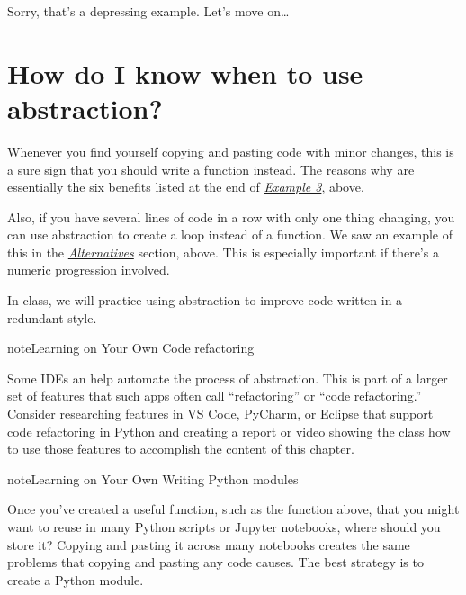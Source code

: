 \documentclass[letterpaper,10pt,english]{sphinxmanual}
\begin{document}
Sorry, that’s a depressing example.  Let’s move on…


\section{How do I know when to use abstraction?}
\label{\detokenize{chapter-7-abstraction:how-do-i-know-when-to-use-abstraction}}
Whenever you find yourself copying and pasting code with minor changes, this is a sure sign that you should write a function instead.  The reasons why are essentially the six benefits listed at the end of {\hyperref[\detokenize{chapter-7-abstraction:example-3-copying-and-pasting-code}]{\emph{Example 3}}}, above.

Also, if you have several lines of code in a row with only one thing changing, you can use abstraction to create a loop instead of a function.  We saw an example of this in the {\hyperref[\detokenize{chapter-7-abstraction:alternatives}]{\emph{Alternatives}}} section, above.  This is especially important if there’s a numeric progression involved.

In class, we will practice using abstraction to improve code written in a redundant style.


\begin{sphinxadmonition}{note}{Learning on Your Own \sphinxhyphen{} Code refactoring}

Some IDEs an help automate the process of abstraction.  This is part of a larger set of features that such apps often call “refactoring” or “code refactoring.”  Consider researching features in VS Code, PyCharm, or Eclipse that support code refactoring in Python and creating a report or video showing the class how to use those features to accomplish the content of this chapter.
\end{sphinxadmonition}

\begin{sphinxadmonition}{note}{Learning on Your Own \sphinxhyphen{} Writing Python modules}

Once you’ve created a useful function, such as the  function above, that you might want to reuse in many Python scripts or Jupyter notebooks, where should you store it?  Copying and pasting it across many notebooks creates the same problems that copying and pasting any code causes.  The best strategy is to create a Python module.
\end{sphinxadmonition}
\end{document}
